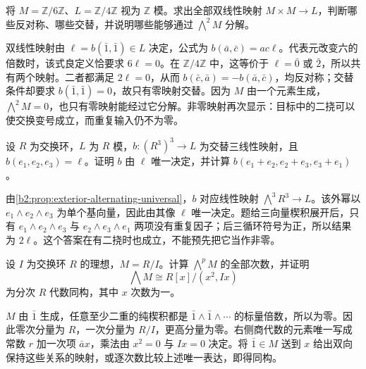 \begin{exercise}\label{b2:ex:09-skew-not-exterior}
	将 \(M=\mathbb Z/6\mathbb Z\)、\(L=\mathbb Z/4\mathbb Z\) 视为 \(\mathbb Z\) 模。求出全部双线性映射 \(M\times M\to L\)，判断哪些反对称、哪些交替，并说明哪些能够通过 \(\bigwedge^2M\) 分解。
\end{exercise}
\begin{solution}
	双线性映射由 \(\ell=b(\bar1,\bar1)\in L\) 决定，公式为 \(b(\bar a,\bar c)=ac\ell\)。代表元改变六的倍数时，该式良定义恰要求 \(6\ell=0\)。在 \(\mathbb Z/4\mathbb Z\) 中，这等价于 \(\ell=\bar0\) 或 \(\bar2\)，所以共有两个映射。二者都满足 \(2\ell=0\)，从而 \(b(\bar c,\bar a)=-b(\bar a,\bar c)\)，均反对称；交替条件却要求 \(b(\bar1,\bar1)=0\)，故只有零映射交替。因为 \(M\) 由一个元素生成，\(\bigwedge^2M=0\)，也只有零映射能经过它分解。非零映射再次显示：目标中的二挠可以使交换变号成立，而重复输入仍不为零。
\end{solution}

\begin{exercise}\label{b2:ex:09-alternating-top-form}
	设 \(R\) 为交换环，\(L\) 为 \(R\) 模，\(b:(R^3)^3\to L\) 为交替三线性映射，且 \(b(e_1,e_2,e_3)=\ell\)。证明 \(b\) 由 \(\ell\) 唯一决定，并计算 \(b(e_1+e_2,e_2+e_3,e_3+e_1)\)。
\end{exercise}
\begin{solution}
	由\cref{b2:prop:exterior-alternating-universal}，\(b\) 对应线性映射 \(\bigwedge^3R^3\to L\)。该外幂以 \(e_1\wedge e_2\wedge e_3\) 为单个基向量，因此由其像 \(\ell\) 唯一决定。题给三向量楔积展开后，只有 \(e_1\wedge e_2\wedge e_3\) 与 \(e_2\wedge e_3\wedge e_1\) 两项没有重复因子；后三循环符号为正，所以结果为 \(2\ell\)。这个答案在有二挠时也成立，不能预先把它当作非零。
\end{solution}

\begin{exercise}\label{b2:ex:09-cyclic-exterior}
	设 \(I\) 为交换环 \(R\) 的理想，\(M=R/I\)。计算 \(\bigwedge^pM\) 的全部次数，并证明
	\[
		\bigwedge M\cong R[x]/(x^2,Ix)
	\]
	为分次 \(R\) 代数同构，其中 \(x\) 次数为一。
\end{exercise}
\begin{solution}
	\(M\) 由 \(\bar1\) 生成，任意至少二重的纯楔积都是 \(\bar1\wedge\bar1\wedge\cdots\) 的标量倍数，所以为零。因此零次分量为 \(R\)，一次分量为 \(R/I\)，更高分量为零。右侧商代数的元素唯一写成常数 \(r\) 加一次项 \(\bar a x\)，乘法由 \(x^2=0\) 与 \(Ix=0\) 决定。将 \(\bar1\in M\) 送到 \(x\) 给出双向保持这些关系的映射，或逐次数比较上述唯一表达，即得同构。
\end{solution}

